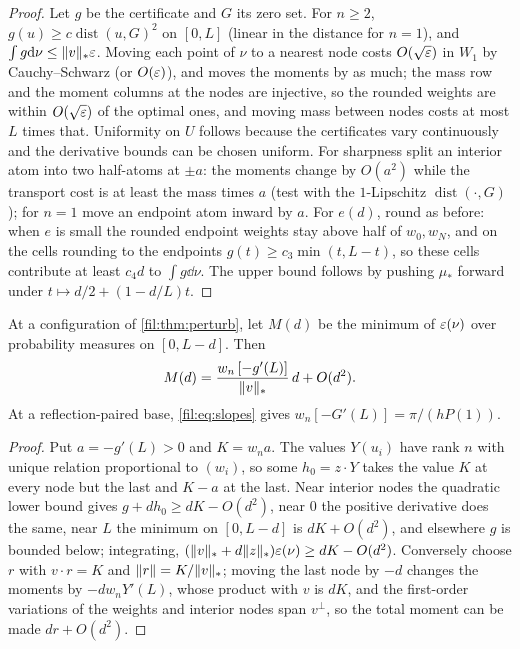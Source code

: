 \begin{proof}
Let $g$ be the certificate and $G$ its zero set. For $n\ge2$, $g(u)\ge c\operatorname{dist}(u,G)^2$ on
$[0,L]$ (linear in the distance for $n=1$), and $\int g\mathrm{d}\nu\le\lVert v\rVert_*\varepsilon$. Moving each point of $\nu$
to a nearest node costs $O(\sqrt{\varepsilon})$ in $W_1$ by Cauchy--Schwarz (or $O(\varepsilon)$), and moves the moments
by as much; the mass row and the moment columns at the nodes are injective, so the rounded weights are
within $O(\sqrt{\varepsilon})$ of the optimal ones, and moving mass between nodes costs at most $L$ times that.
Uniformity on $U$ follows because the certificates vary continuously and the derivative bounds can be
chosen uniform. For sharpness split an interior atom into two half-atoms at $\pm a$: the moments change by
$O(a^2)$ while the transport cost is at least the mass times $a$ (test with the $1$-Lipschitz
$\operatorname{dist}(\cdot,G)$); for $n=1$ move an endpoint atom inward by $a$. For $e(d)$, round as
before: when $e$ is small the rounded endpoint weights stay above half of $w_0,w_N$, and on the cells
rounding to the endpoints $g(t)\ge c_3\min(t,L-t)$, so these cells contribute at least $c_4d$ to
$\int g\dd\nu$. The upper bound follows by pushing $\mu_*$ forward under $t\mapsto d/2+(1-d/L)t$.
\end{proof}

\begin{theorem}\label{fil:thm:short}
At a configuration of \cref{fil:thm:perturb}, let $M(d)$ be the minimum of $\varepsilon(\nu)$ over probability
measures on $[0,L-d]$. Then
\[
 M(d)=\frac{w_n\,[-g'(L)]}{\lVert v\rVert_*}\,d+O(d^2).
\]
At a reflection-paired base, \eqref{fil:eq:slopes} gives $w_n[-G'(L)]=\pi/(hP(1))$.
\end{theorem}

\begin{proof}
Put $a=-g'(L)>0$ and $K=w_na$. The values $Y(u_i)$ have rank $n$ with unique relation proportional to
$(w_i)$, so some $h_0=z\cdot Y$ takes the value $K$ at every node but the last and $K-a$ at the last.
Near interior nodes the quadratic lower bound gives $g+dh_0\ge dK-O(d^2)$, near $0$ the positive
derivative does the same, near $L$ the minimum on $[0,L-d]$ is $dK+O(d^2)$, and elsewhere $g$ is bounded
below; integrating, $(\lVert v\rVert_*+d\lVert z\rVert_*)\varepsilon(\nu)\ge dK-O(d^2)$. Conversely choose $r$ with $v\cdot r=K$
and $\lVert r\rVert=K/\lVert v\rVert_*$; moving the last node by $-d$ changes the moments by $-dw_nY'(L)$, whose
product with $v$ is $dK$, and the first-order variations of the weights and interior nodes span $v^\perp$,
so the total moment can be made $dr+O(d^2)$.
\end{proof}

